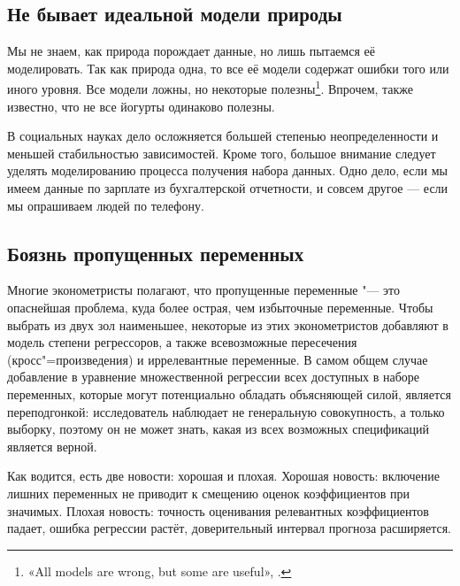 \documentclass[11pt]{article}
\begin{document}

\subsection{Не бывает идеальной модели природы}


 
Мы не знаем, как природа порождает данные, но лишь пытаемся её моделировать. Так как природа одна, то все её модели содержат ошибки того или иного уровня.  Все модели ложны, но некоторые полезны\footnote{«All models are wrong, but some are useful», \citep{box1987empirical}.}. Впрочем, также известно, что не все йогурты одинаково полезны.

В социальных науках дело осложняется большей степенью неопределенности и меньшей стабильностью зависимостей. Кроме того, большое внимание следует уделять моделированию процесса получения набора данных. Одно дело, если мы имеем данные по зарплате из бухгалтерской отчетности, и совсем другое --- если мы опрашиваем людей по телефону. 



\subsection{Боязнь пропущенных переменных}

Многие эконометристы полагают, что пропущенные переменные "--- это опаснейшая проблема, куда более острая, чем избыточные переменные. Чтобы выбрать из двух зол наименьшее, некоторые из этих эконометристов добавляют в модель степени регрессоров, а также всевозможные пересечения (кросс"=произведения) и иррелевантные переменные. В самом общем случае добавление в уравнение множественной регрессии всех доступных в наборе переменных, которые могут потенциально обладать объясняющей силой, является переподгонкой: исследователь наблюдает не генеральную совокупность, а только выборку, поэтому он не может знать, какая из всех возможных спецификаций является верной.

Как водится, есть две новости: хорошая и плохая. Хорошая новость: включение лишних переменных не приводит к смещению оценок коэффициентов при значимых. Плохая новость: точность оценивания релевантных коэффициентов падает, ошибка регрессии растёт, доверительный интервал прогноза расширяется.
\end{document}
